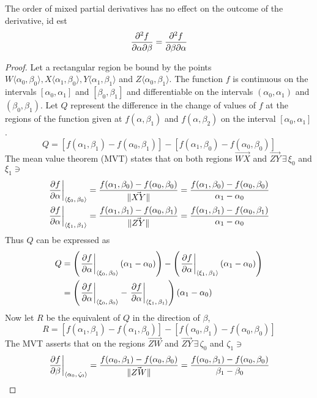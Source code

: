 \begin{lemma}
	The order of mixed partial derivatives has no effect on the outcome of the derivative, id est
	$$
		\pdv{f}{\alpha}{\beta}=\pdv{f}{\beta}{\alpha}
	$$
	\begin{proof}
		Let a rectangular region be bound by the points $W\langle \alpha_0,\beta_0\rangle,X\langle \alpha_1,\beta_0\rangle,
		Y\langle \alpha_1,\beta_1\rangle$ and $Z\langle \alpha_0,\beta_1\rangle$. The function $f$ is continuous on the
		intervals $[\alpha_0,\alpha_1]$ and $[\beta_0,\beta_1]$ and differentiable on the intervals $(\alpha_0,\alpha_1)$ and
		$(\beta_0,\beta_1)$. Let $Q$ represent the difference in the change of values of $f$ at the regions of the function
		given at $f(\alpha,\beta_1)$ and $f(\alpha,\beta_2)$ on the interval $[\alpha_0,\alpha_1]$.
		$$
		Q=[f(\alpha_1,\beta_1)-f(\alpha_0,\beta_1)]-[f(\alpha_1,\beta_0)-f(\alpha_0,\beta_0)]
		$$
		The mean value theorem (MVT) states that on both regions $\vec{WX}$ and $\vec{ZY}\,\exists\,\xi_0$ and $\xi_1\ni$
		\begin{align*}
			\eval{\pdv{f}{\alpha}}_{\point{\xi_0}{\beta_0}}&=\frac{f(\alpha_1,\beta_0)-f(\alpha_0,\beta_0)}{\lVert\vec{XY}\rVert}=\frac{f(\alpha_1,\beta_0)-f(\alpha_0,\beta_0)}{\alpha_1-\alpha_0}\\
			\eval{\pdv{f}{\alpha}}_{\point{\xi_1}{\beta_1}}&=\frac{f(\alpha_1,\beta_1)-f(\alpha_0,\beta_1)}{\lVert\vec{ZY}\rVert}=\frac{f(\alpha_1,\beta_1)-f(\alpha_0,\beta_1)}{\alpha_1-\alpha_0}
		\end{align*}
		Thus $Q$ can be expressed as
		\begin{align*}
			Q&=\left(\eval{\pdv{f}{\alpha}}_{\point{\xi_0}{\beta_0}}\left(\alpha_1-\alpha_0\right)\right)-\left(\eval{\pdv{f}{\alpha}}_{\point{\xi_1}{\beta_1}}\left(\alpha_1-\alpha_0\right)\right)\\
			&=\left(\eval{\pdv{f}{\alpha}}_{\point{\xi_0}{\beta_0}}-\eval{\pdv{f}{\alpha}}_{\point{\xi_1}{\beta_1}}\right)\left(\alpha_1-\alpha_0\right)
		\end{align*}
		Now let $R$ be the equivalent of $Q$ in the direction of $\beta$,
		$$
			R=[f(\alpha_1,\beta_1)-f(\alpha_1,\beta_0)]-[f(\alpha_0,\beta_1)-f(\alpha_0,\beta_0)]
		$$
		The MVT asserts that on the regions $\vec{ZW}$ and $\vec{ZY}\,\exists\,\zeta_0$ and $\zeta_1\ni$
		\begin{align*}
			\eval{\pdv{f}{\beta}}_{\point{\alpha_0}{\zeta_0}}&=\frac{f(\alpha_0,\beta_1)-f(\alpha_0,\beta_0)}{\lVert\vec{ZW}\rVert}=\frac{f(\alpha_0,\beta_1)-f(\alpha_0,\beta_0)}{\beta_1-\beta_0}\\

\end{align*}
\end{proof}
\end{lemma}
